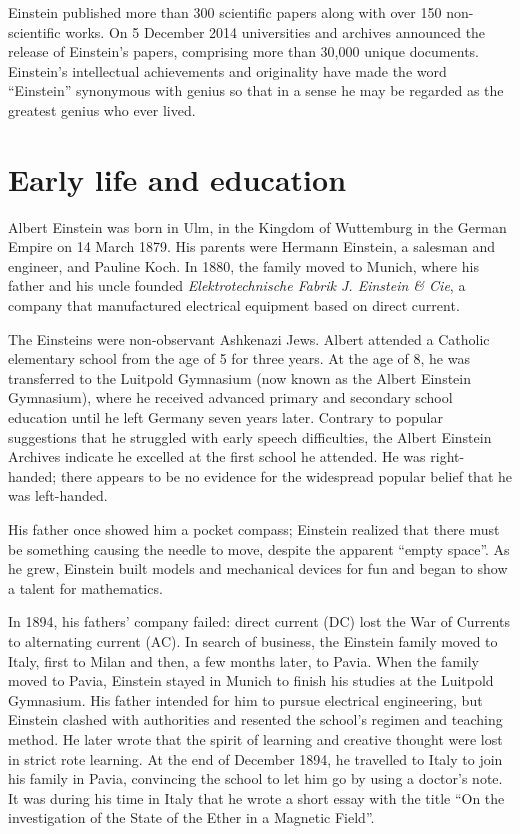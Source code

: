 \documentclass{article}
\begin{document}
Einstein published more than 300 scientific papers along with over
150 non-scientific works. On 5 December 2014 universities and
archives announced the release of Einstein's papers, comprising more
than 30,000 unique documents. Einstein's intellectual achievements and
originality have made the word ``Einstein'' synonymous with genius so
that in a sense he may be regarded as the greatest genius who ever lived.

\section{Early life and education}

Albert Einstein was born in Ulm, in the Kingdom of Wuttemburg in
the German Empire on 14 March 1879. His parents were Hermann Einstein,
a salesman and engineer, and Pauline Koch. In 1880, the family moved
to Munich, where his father and his uncle founded
\emph{Elektrotechnische Fabrik J. Einstein \& Cie}, a company that
manufactured electrical equipment based on direct current.

The Einsteins were non-observant Ashkenazi Jews. Albert attended a
Catholic elementary school from the age of 5 for three years. At the
age of 8, he was transferred to the Luitpold Gymnasium (now known as
the Albert Einstein Gymnasium), where he received advanced primary and
secondary school education until he left Germany seven years later.
Contrary to popular suggestions that he struggled with early speech
difficulties, the Albert Einstein Archives indicate he excelled at
the first school he attended. He was right-handed; there appears to
be no evidence for the widespread popular belief that he was left-handed.

His father once showed him a pocket compass; Einstein realized that
there must be something causing the needle to move, despite the apparent
``empty space''. As he grew, Einstein built models and mechanical devices
for fun and began to show a talent for mathematics.

In 1894, his fathers' company failed: direct current (DC) lost the War of
Currents to alternating current (AC). In search of business, the Einstein
family moved to Italy, first to Milan and then, a few months later, to Pavia.
When the family moved to Pavia, Einstein stayed in Munich to finish his
studies at the Luitpold Gymnasium. His father intended for him to pursue
electrical engineering, but Einstein clashed with authorities and resented
the school's regimen and teaching method. He later wrote that the spirit of
learning and creative thought were lost in strict rote learning. At the end
of December 1894, he travelled to Italy to join his family in Pavia,
convincing the school to let him go by using a doctor's note. It was during
his time in Italy that he wrote a short essay with the title ``On the
investigation of the State of the Ether in a Magnetic Field''.
\end{document}
